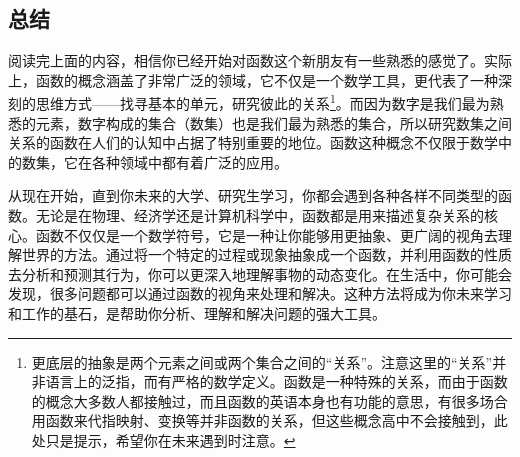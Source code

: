 \subsection{总结}

阅读完上面的内容，相信你已经开始对函数这个新朋友有一些熟悉的感觉了。实际上，函数的概念涵盖了非常广泛的领域，它不仅是一个数学工具，更代表了一种深刻的思维方式——找寻基本的单元，研究彼此的关系\footnote{更底层的抽象是两个元素之间或两个集合之间的“关系”。注意这里的“关系”并非语言上的泛指，而有严格的数学定义。函数是一种特殊的关系，而由于函数的概念大多数人都接触过，而且函数的英语本身也有功能的意思，有很多场合用函数来代指映射、变换等并非函数的关系，但这些概念高中不会接触到，此处只是提示，希望你在未来遇到时注意。}。而因为数字是我们最为熟悉的元素，数字构成的集合（数集）也是我们最为熟悉的集合，所以研究数集之间关系的函数在人们的认知中占据了特别重要的地位。函数这种概念不仅限于数学中的数集，它在各种领域中都有着广泛的应用。

从现在开始，直到你未来的大学、研究生学习，你都会遇到各种各样不同类型的函数。无论是在物理、经济学还是计算机科学中，函数都是用来描述复杂关系的核心。函数不仅仅是一个数学符号，它是一种让你能够用更抽象、更广阔的视角去理解世界的方法。通过将一个特定的过程或现象抽象成一个函数，并利用函数的性质去分析和预测其行为，你可以更深入地理解事物的动态变化。在生活中，你可能会发现，很多问题都可以通过函数的视角来处理和解决。这种方法将成为你未来学习和工作的基石，是帮助你分析、理解和解决问题的强大工具。
